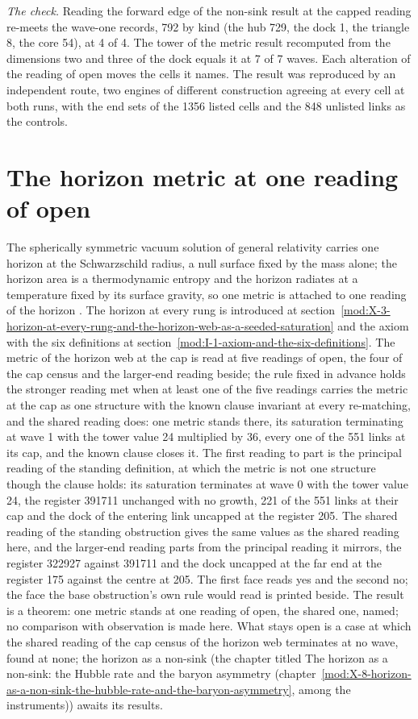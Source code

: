 \begin{chproof}
\textit{The check.} Reading the forward edge of the non-sink result at the capped reading re-meets the wave-one records, 792 by kind (the hub 729, the dock 1, the triangle 8, the core 54), at 4 of 4. The tower of the metric result recomputed from the dimensions two and three of the dock equals it at 7 of 7 waves. Each alteration of the reading of open moves the cells it names. The result was reproduced by an independent route, two engines of different construction agreeing at every cell at both runs, with the end sets of the 1356 listed cells and the 848 unlisted links as the controls.
\end{chproof}
\section{The horizon metric at one reading of open}\label{mod:X-3-D539493-zmrh-t1}
The spherically symmetric vacuum solution of general relativity carries one horizon at the Schwarzschild radius, a null surface fixed by the mass alone; the horizon area is a thermodynamic entropy and the horizon radiates at a temperature fixed by its surface gravity, so one metric is attached to one reading of the horizon \cite{Schwarzschild1916,Bekenstein1973,Hawking1975}. The horizon at every rung is introduced at section~\ref{mod:X-3-horizon-at-every-rung-and-the-horizon-web-as-a-seeded-saturation} and the axiom with the six definitions at section~\ref{mod:I-1-axiom-and-the-six-definitions}.
The metric of the horizon web at the cap is read at five readings of open, the four of the cap census and the larger-end reading beside; the rule fixed in advance holds the stronger reading met when at least one of the five readings carries the metric at the cap as one structure with the known clause invariant at every re-matching, and the shared reading does: one metric stands there, its saturation terminating at wave 1 with the tower value 24 multiplied by 36, every one of the 551 links at its cap, and the known clause closes it.
The first reading to part is the principal reading of the standing definition, at which the metric is not one structure though the clause holds: its saturation terminates at wave 0 with the tower value 24, the register 391711 unchanged with no growth, 221 of the 551 links at their cap and the dock of the entering link uncapped at the register 205. The shared reading of the standing obstruction gives the same values as the shared reading here, and the larger-end reading parts from the principal reading it mirrors, the register 322927 against 391711 and the dock uncapped at the far end at the register 175 against the centre at 205. The first face reads yes and the second no; the face the base obstruction's own rule would read is printed beside.
The result is a theorem: one metric stands at one reading of open, the shared one, named; no comparison with observation is made here.
What stays open is a case at which the shared reading of the cap census of the horizon web terminates at no wave, found at none; the horizon as a non-sink (the chapter titled The horizon as a non-sink: the Hubble rate and the baryon asymmetry (chapter~\ref{mod:X-8-horizon-as-a-non-sink-the-hubble-rate-and-the-baryon-asymmetry}, among the instruments)) awaits its results.
